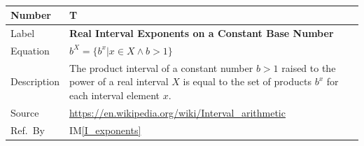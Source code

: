\documentclass[12pt]{article}
\newcommand{\colAwidth}{0.13\textwidth}
\newcommand{\colBwidth}{0.82\textwidth}
\newcounter{theorynum} %
\newcommand{\iref}[1]{IM\ref{#1}}
\begin{document}
~\newline

\noindent
\begin{minipage}{\textwidth}
	\renewcommand*{\arraystretch}{1.5}
	\begin{tabular}{| p{\colAwidth} | p{\colBwidth}|}
		\hline
		\rowcolor[gray]{0.9}
		Number& T{theorynum}\thetheorynum 
		\label{T_exponents}\\
		\hline
		Label&\bf Real Interval Exponents on a Constant Base Number\\
		\hline
		Equation&  $b^X = \{b^x | x \in X \wedge b > 1\}$\\
		\hline
		Description & The product interval of a constant number $b > 1$ raised 
		to the power of a real interval $X$ is equal to the set of products 
		$b^x$ for each interval element $x$.\\
		\hline
		Source & \url{https://en.wikipedia.org/wiki/Interval_arithmetic}\\
		\hline
		Ref.\ By & \iref{I_exponents}\\
		\hline
	\end{tabular}
\end{minipage}\\

~\newline
\end{document}
